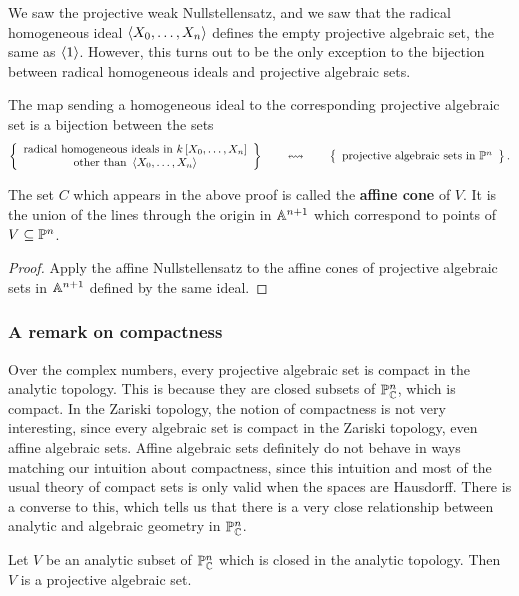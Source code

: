 We saw the projective weak Nullstellensatz, and we saw that the radical homogeneous ideal $ \abr{X_0, \dots, X_n} $ defines the empty projective algebraic set, the same as $ \abr{1} $. However, this turns out to be the only exception to the bijection between radical homogeneous ideals and projective algebraic sets.

\begin{theorem}
The map sending a homogeneous ideal to the corresponding projective algebraic set is a bijection between the sets
$$ \correspondence{\text{radical homogeneous ideals in} \ k\sbr{X_0, \dots, X_n} \\ \text{other than} \ \abr{X_0, \dots, X_n}}{\text{projective algebraic sets in} \ \PP^n}. $$
\end{theorem}

The set $ C $ which appears in the above proof is called the \textbf{affine cone} of $ V $. It is the union of the lines through the origin in $ \AA^{n + 1} $ which correspond to points of $ V \subseteq \PP^n $.

\begin{proof}
Apply the affine Nullstellensatz to the affine cones of projective algebraic sets in $ \AA^{n + 1} $ defined by the same ideal.
\end{proof}

\subsubsection{A remark on compactness}

Over the complex numbers, every projective algebraic set is compact in the analytic topology. This is because they are closed subsets of $ \PP_\CC^n $, which is compact. In the Zariski topology, the notion of compactness is not very interesting, since every algebraic set is compact in the Zariski topology, even affine algebraic sets. Affine algebraic sets definitely do not behave in ways matching our intuition about compactness, since this intuition and most of the usual theory of compact sets is only valid when the spaces are Hausdorff. There is a converse to this, which tells us that there is a very close relationship between analytic and algebraic geometry in $ \PP_\CC^n $.

\begin{theorem}
\label{thm:chowtheorem}
Let $ V $ be an analytic subset of $ \PP_\CC^n $ which is closed in the analytic topology. Then $ V $ is a projective algebraic set.
\end{theorem}

